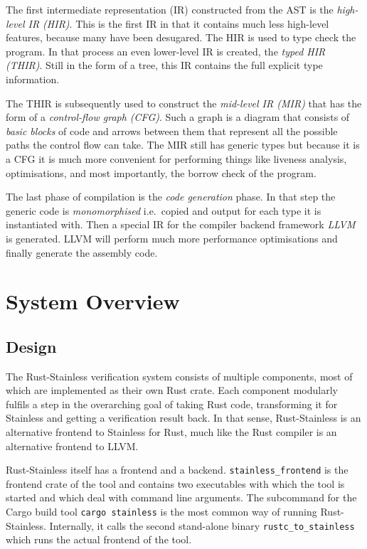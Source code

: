 The first intermediate representation (IR) constructed from the AST is
the \emph{high-level IR (HIR)}. This is the first IR in that it contains
much less high-level features, because many have been desugared. The HIR
is used to type check the program. In that process an even lower-level
IR is created, the \emph{typed HIR (THIR)}. Still in the form of a tree,
this IR contains the full explicit type information.

The THIR is subsequently used to construct the \emph{mid-level IR (MIR)}
that has the form of a \emph{control-flow graph (CFG)}. Such a graph is
a diagram that consists of \emph{basic blocks} of code and arrows
between them that represent all the possible paths the control flow can
take. The MIR still has generic types but because it is a CFG it is much
more convenient for performing things like liveness analysis,
optimisations, and most importantly, the borrow check of the program.

The last phase of compilation is the \emph{code generation} phase. In
that step the generic code is \emph{monomorphised} i.e.~copied and
output for each type it is instantiated with. Then a special IR for the
compiler backend framework \emph{LLVM} \cite{llvm} is generated. LLVM
will perform much more performance optimisations and finally generate
the assembly code.

\section{System Overview}

\subsection{Design}

The Rust-Stainless verification system consists of multiple components,
most of which are implemented as their own Rust crate. Each component
modularly fulfils a step in the overarching goal of taking Rust code,
transforming it for Stainless and getting a verification result back. In
that sense, Rust-Stainless is an alternative frontend to Stainless for
Rust, much like the Rust compiler is an alternative frontend to LLVM.

Rust-Stainless itself has a frontend and a backend.
\lstinline!stainless_frontend! is the frontend crate of the tool and contains
two executables with which the tool is started and which deal with command line
arguments. The subcommand for the Cargo build tool \passthrough{\lstinline!cargo
stainless!} is the most common way of running Rust-Stainless. Internally, it
calls the second stand-alone binary \lstinline!rustc_to_stainless! which runs
the actual frontend of the tool.

